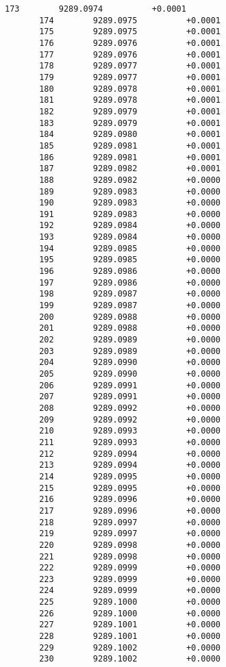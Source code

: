 \documentclass[11pt]{article}
\begin{document}
\begin{Verbatim}[commandchars=\\\{\}]
       173        9289.0974          +0.0001
       174        9289.0975          +0.0001
       175        9289.0975          +0.0001
       176        9289.0976          +0.0001
       177        9289.0976          +0.0001
       178        9289.0977          +0.0001
       179        9289.0977          +0.0001
       180        9289.0978          +0.0001
       181        9289.0978          +0.0001
       182        9289.0979          +0.0001
       183        9289.0979          +0.0001
       184        9289.0980          +0.0001
       185        9289.0981          +0.0001
       186        9289.0981          +0.0001
       187        9289.0982          +0.0001
       188        9289.0982          +0.0000
       189        9289.0983          +0.0000
       190        9289.0983          +0.0000
       191        9289.0983          +0.0000
       192        9289.0984          +0.0000
       193        9289.0984          +0.0000
       194        9289.0985          +0.0000
       195        9289.0985          +0.0000
       196        9289.0986          +0.0000
       197        9289.0986          +0.0000
       198        9289.0987          +0.0000
       199        9289.0987          +0.0000
       200        9289.0988          +0.0000
       201        9289.0988          +0.0000
       202        9289.0989          +0.0000
       203        9289.0989          +0.0000
       204        9289.0990          +0.0000
       205        9289.0990          +0.0000
       206        9289.0991          +0.0000
       207        9289.0991          +0.0000
       208        9289.0992          +0.0000
       209        9289.0992          +0.0000
       210        9289.0993          +0.0000
       211        9289.0993          +0.0000
       212        9289.0994          +0.0000
       213        9289.0994          +0.0000
       214        9289.0995          +0.0000
       215        9289.0995          +0.0000
       216        9289.0996          +0.0000
       217        9289.0996          +0.0000
       218        9289.0997          +0.0000
       219        9289.0997          +0.0000
       220        9289.0998          +0.0000
       221        9289.0998          +0.0000
       222        9289.0999          +0.0000
       223        9289.0999          +0.0000
       224        9289.0999          +0.0000
       225        9289.1000          +0.0000
       226        9289.1000          +0.0000
       227        9289.1001          +0.0000
       228        9289.1001          +0.0000
       229        9289.1002          +0.0000
       230        9289.1002          +0.0000

\end{Verbatim}
\end{document}
